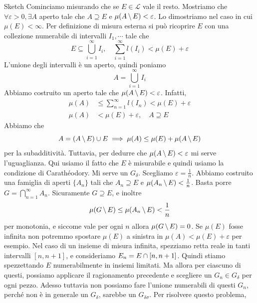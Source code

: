\documentclass[a4paper]{article}
\begin{document}
\begin{radioactive}
\begin{snippetproof}{Sketch}
    Cominciamo misurando che se \(E \in \mathcal L\) vale il resto.
    Mostriamo che \(\forall \varepsilon > 0, \exists A\) aperto
    tale che \(A \supseteq E\) e \(\mu(A \,\backslash\, E) < \varepsilon\).
    Lo dimostriamo nel caso in cui \(\mu(E) < \infty\).
    Per definizione di misura esterna si può ricoprire \(E\)
    con una collezione numerabile di intervalli \(I_1, \cdots\) tale che
    \[
        E \subseteq \bigcup_{i=1}^\infty I_i, \quad \sum_{i=1}^\infty l(I_i) < \mu(E) + \varepsilon
    \]
    L'unione degli intervalli è un aperto, quindi poniamo
    \[
        A = \bigcup_{i=1}^\infty I_i
    \]
    Abbiamo costruito un aperto tale che \(\mu(A \,\backslash\, E) < \varepsilon\).
    Infatti,
    \begin{align*}
        \mu(A) &\leq \sum_{n=1}^\infty l(I_n) < \mu(E) + \varepsilon \\
        \mu(A) &< \mu(E) + \varepsilon, \quad A \supseteq E
    \end{align*}
    Abbiamo che
    \[
        A = (A \,\backslash\, E) \cup E
        \implies \mu(A) \leq \mu(E) + \mu(A \,\backslash\, E)
    \]
    per la subadditività.
    Tuttavia, per dedurre che \(\mu(A \,\backslash\, E) < \varepsilon\)
    mi serve l'uguaglianza. Qui usiamo il fatto che \(E\) è misurabile e quindi
    usiamo la condizione di Carathéodory.
    Mi serve un \(G_\delta\). Scegliamo \(\varepsilon = \frac{1}{n}\).
    Abbiamo costruito una famiglia di aperti \(\{A_n\}\)
    tali che \(A_n \supseteq E\) e \(\mu(A_n \,\backslash\, E) < \frac{1}{n}\).
    Basta porre \(G = \bigcap_{n=1}^\infty A_n\).
    Sicuramente \(G \supseteq E\), e inoltre
    \[
        \mu(G \,\backslash\, E) \leq \mu(A_n\,\backslash\, E) < \frac{1}{n}
    \]
    per monotonia, e siccome vale per ogni \(n\) allora \(\mu(G \,\backslash\, E) = 0\).
    Se \(\mu(E)\) fosse infinita non potremmo spostare \(\mu(E)\) a sinistra in \(\mu(A) < \mu(E) + \varepsilon\)
    per esempio.
    Nel caso di un insieme di misura infinita, spezziamo retta reale in tanti intervalli
    \([n,n+1]\), e consideriamo \(E_n = E \cap [n,n+1]\).
    Quindi stiamo spezzettando \(E\) numerabilmente in insiemi limitati. Ma allora per ciascuno di questi,
    possiamo applicare il ragionamento precedente e scegliere un \(G_n \in G_\delta\)
    per ogni pezzo. Adesso tuttavia non possiamo fare l'unione
    numerabili di questi \(G_n\), perché non è in generale un \(G_\delta\),
    sarebbe un \(G_{\delta\sigma}\). Per risolvere questo problema,

\end{snippetproof}
\end{radioactive}
\end{document}
